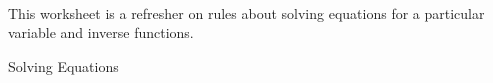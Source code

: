 \documentclass[11pt,fleqn]{article}
\begin{document}
\renewcommand{\headrulewidth}{0pt}
\newcommand{\blank}[1]{\rule{#1}{0.75pt}}
\newcommand{\bc}{\begin{center}}
\newcommand{\ec}{\end{center}}
\renewcommand{\d}{\displaystyle}

\vspace*{-0.7in}

\begin{center}
  \large
  \\ \vfill
\end{center}
 This worksheet is a refresher on rules about solving equations for a particular variable and inverse functions. \\ \vfill
 
 \begin{center} Solving Equations \end{center}
\end{document}

